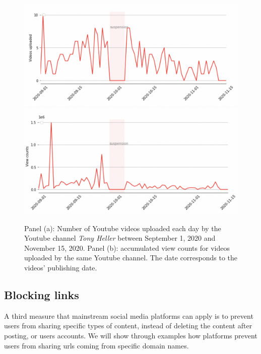 \documentclass{article}
\begin{document}
\begin{figure}
	\centering
			\includegraphics[scale=0.25]{./img/tony/fig1_tony.png}
			\includegraphics[scale=0.25]{./img/tony/fig2_tony.png}
	\caption{Panel (a): Number of Youtube videos uploaded each day by the Youtube channel {\it Tony Heller} between September 1, 2020 and November 15, 2020. Panel (b): accumulated view counts for videos uploaded by the same Youtube channel. The date corresponds to the videos’  publishing date. 
}
	\label{fig1_tony}
\end{figure}

\subsection{Blocking links}

A third measure that mainstream social media platforms can apply is to prevent users from sharing specific types of content, instead of deleting the content after posting, or users accounts. We will show through examples how platforms prevent users from sharing urls coming from specific domain names.
\end{document}
